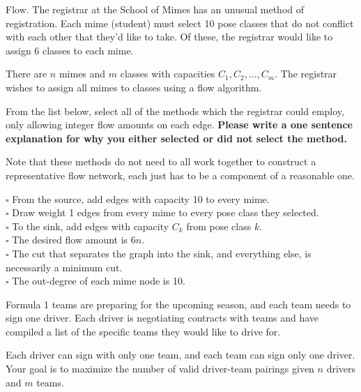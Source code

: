 \documentclass[12pt]{exam}
\begin{document}
\begin{questions}

\question[15] [W5] Flow. The registrar at the School of Mimes has an unusual method of registration. Each mime (student) must select 10 pose classes that do not conflict with each other that they'd like to take. Of these, the registrar would like to assign 6 classes to each mime.

There are $n$ mimes and $m$ classes with capacities $C_1, C_2, \dots, C_m$. The registrar wishes to assign all mimes to classes using a flow algorithm.

From the list below, select all of the methods which the registrar could employ, only allowing integer flow amounts on each edge. \textbf{Please write a one sentence explanation for why you either selected or did not select the method.}

Note that these methods do not need to all work together to construct a representative flow network, each just has to be a component of a reasonable one.

$\square$ From the source, add edges with capacity 10 to every mime. \\
$\square$ Draw weight 1 edges from every mime to every pose class they selected. \\
$\square$ To the sink, add edges with capacity $C_k$ from pose class $k$. \\
$\square$ The desired flow amount is $6n$. \\
$\square$ The cut that separates the graph into the sink, and everything else, is necessarily a minimum cut.\\
$\square$ The out-degree of each mime node is 10. \\


\clearpage

\question[20] [W6]
Formula 1 teams are preparing for the upcoming season, and each team needs to sign one driver. Each driver is negotiating contracts with teams and have compiled a list of the specific teams they would like to drive for.

Each driver can sign with only one team, and each team can sign only one driver. Your goal is to maximize the number of valid driver-team pairings given $n$ drivers and $m$ teams.

\end{questions}
\end{document}
